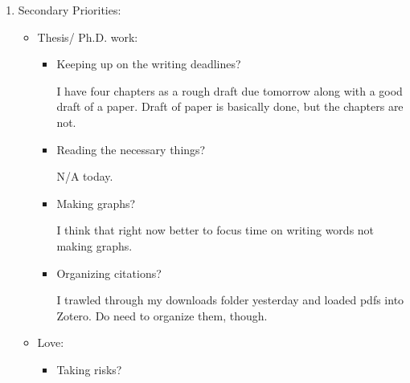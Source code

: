 \documentclass[12pt]{article}
\renewcommand{\,}{\textsuperscript{,}}
\begin{document}
\begin{enumerate}
\begin{itemize}
\begin{itemize}
None today so far.  
Will try to have some tonight.

\item Prayer?

\item Time for sacred\footnote{there we go, a distinction between absence of sound and the actual goal of silence} silence?

Nope!

\item Deep breaths?

Three just now.  
Will try to remember doing that over stretching time.

\end{itemize}

\end{itemize}

\item Secondary Priorities:

\begin{itemize}

\item Thesis/ Ph.D. work:

\begin{itemize}

\item Keeping up on the writing deadlines?

I have four chapters as a rough draft due tomorrow along with a good draft of a paper.  
Draft of paper is basically done, but the chapters are not.

\item Reading the necessary things?

N/A today.

\item Making graphs?

I think that right now better to focus time on writing words not making graphs.

\item Organizing citations?

I trawled through my downloads folder yesterday and loaded pdfs into Zotero.  
Do need to organize them, though.

\end{itemize}

\item Love:

\begin{itemize}

\item Taking risks?


\end{itemize}
\end{itemize}
\end{enumerate}
\end{document}
